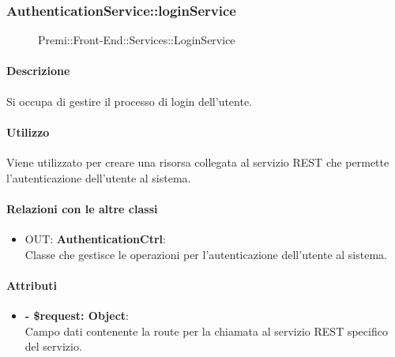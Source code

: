 		\subsubsection{AuthenticationService::loginService}
		\begin{figure}[h]
			\centering
			\caption[Premi::Front-End::Services::LoginService]{Premi::Front-End::Services::LoginService}
		\end{figure}
		
		\paragraph{Descrizione}
		Si occupa di gestire il processo di login dell'utente.
		
		\paragraph{Utilizzo}
		Viene utilizzato per creare una risorsa collegata al servizio REST che permette l'autenticazione dell'utente al sistema.
		
		\paragraph{Relazioni con le altre classi}
		\begin{itemize}
			\item OUT: \textbf{AuthenticationCtrl}:\\
			Classe che gestisce le operazioni per l'autenticazione dell'utente al sistema.
		\end{itemize}
		
		\paragraph{Attributi}
		\begin{itemize}
			\item \textbf{- \$request: Object}:\\
			Campo dati contenente la route per la chiamata al servizio REST specifico del servizio.
		\end{itemize}	
		
